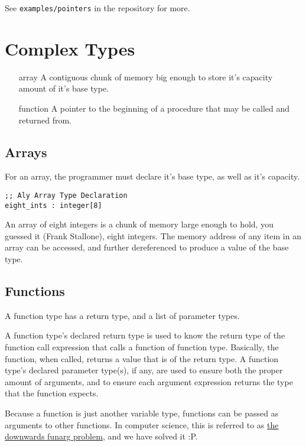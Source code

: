 \documentclass[12pt]{report}
\begin{document}
See \verb|examples/pointers| in the repository for more.

\section{Complex Types}
\label{subsec:types-complex-types}

\begin{itemize}
\item[array]    A contiguous chunk of memory big enough to store it's capacity amount of it's base type.
\item[function] A pointer to the beginning of a procedure that may be called and returned from.
\end{itemize}

\subsection*{Arrays}
\label{subsec:types-complex-types-arrays}
For an array, the programmer must declare it's base type, as well as it's capacity.
\begin{Verbatim}[samepage=true]
;; Aly Array Type Declaration
eight_ints : integer[8]
\end{Verbatim}

An array of eight integers is a chunk of memory large enough to hold, you guessed it (Frank Stallone), eight integers. The memory address of any item in an array can be accessed, and further dereferenced to produce a value of the base type.

\subsection*{Functions}
\label{subsec:types-complex-types-functions}

A function type has a return type, and a list of parameter types.

A function type's declared return type is used to know the return type of the function call expression that calls a function of function type. Basically, the function, when called, returns a value that is of the return type.
A function type's declared parameter type(s), if any, are used to ensure both the proper amount of arguments, and to ensure each argument expression returns the type that the function expects.

Because a function is just another variable type, functions can be passed as arguments to other functions. In computer science, this is referred to as \href{https://en.wikipedia.org/wiki/Funarg_problem}{the downwards funarg problem}, and we have solved it :P.
\end{document}
